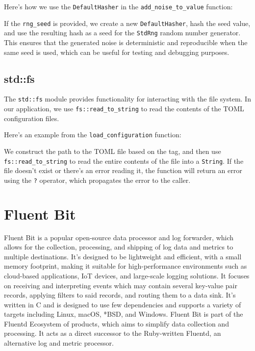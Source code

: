 Here's how we use the \lstinline|DefaultHasher| in the \texttt{add\_noise\_to\_value} function:



If the \texttt{rng\_seed} is provided, we create a new \texttt{DefaultHasher}, hash the seed value, and use the resulting hash as a seed for the \texttt{StdRng} random number generator. This ensures that the generated noise is deterministic and reproducible when the same seed is used, which can be useful for testing and debugging purposes.

\subsection{std::fs}
The \texttt{std::fs} module provides functionality for interacting with the file system. In our application, we use \texttt{fs::read\_to\_string} to read the contents of the TOML configuration files.

Here's an example from the \texttt{load\_configuration} function:



We construct the path to the TOML file based on the tag, and then use \texttt{fs::read\_to\_string} to read the entire contents of the file into a \texttt{String}. If the file doesn't exist or there's an error reading it, the function will return an error using the \texttt{?} operator, which propagates the error to the caller.

\section{Fluent Bit}
Fluent Bit is a popular open-source data processor and log forwarder, which allows for the collection, processing, and shipping of log data and metrics to multiple destinations. It's designed to be lightweight and efficient, with a small memory footprint, making it suitable for high-performance environments such as cloud-based applications, IoT devices, and large-scale logging solutions. It focuses on receiving and interpreting events which may contain several key-value pair records, applying filters to said records, and routing them to a data sink. It's written in C and is designed to use few dependencies and supports a variety of targets including Linux, macOS, *BSD, and Windows. Fluent Bit is part of the Fluentd Ecosystem of products, which aims to simplify data collection and processing. It acts as a direct successor to the Ruby-written Fluentd, an alternative log and metric processor.

